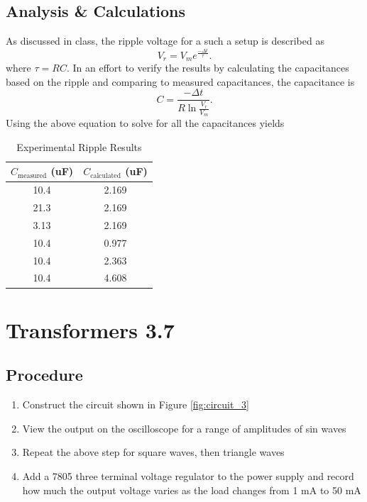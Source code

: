 \documentclass[12pt,letterpaper]{report}
\begin{document}
\subsection*{Analysis \& Calculations}
As discussed in class, the ripple voltage for a such a setup is described as
$$
V_r = V_me^{\frac{-\Delta t}{\tau}}.
$$
where $ \tau = RC $. In an effort to verify the results by calculating the capacitances based on the ripple and comparing to measured capacitances, the capacitance is
$$
C = \frac{- \Delta t}{R\ln \frac{V_r}{V_m}}.
$$
Using the above equation to solve for all the capacitances yields

\begin{table}[ht]
\caption{Experimental Ripple Results} %
\centering 
    \begin{tabular}{| c | c |}
    \hline  
    $C_{\text{measured}}$ (uF) & $C_{\text{calculated}}$ (uF)\\
    \hline
    10.4 & 2.169 \\
    21.3 & 2.169 \\
    3.13 & 2.169 \\
    10.4 & 0.977 \\
    10.4 & 2.363 \\
    10.4 & 4.608 \\
    \hline
    \end{tabular}
    \label{table:c_comparisons}
\end{table}

\section*{Transformers 3.7}
\subsection*{Procedure}

\begin{enumerate}
\item Construct the circuit shown in Figure \ref{fig:circuit_3}
\item View the output on the oscilloscope for a range of amplitudes of sin waves
\item Repeat the above step for square waves, then triangle waves
\item Add a 7805 three terminal voltage regulator to the power supply and record how much the  output voltage varies as the load changes from 1 mA to 50 mA
\end{enumerate}
\end{document}
